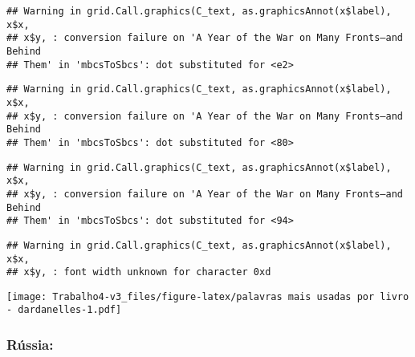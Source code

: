 \documentclass[]{article}
\newenvironment{Shaded}{\begin{snugshade}}{\end{snugshade}}
\newcommand{\KeywordTok}[1]{\textcolor[rgb]{0.13,0.29,0.53}{\textbf{#1}}}
\newcommand{\NormalTok}[1]{#1}
\newcommand{\OperatorTok}[1]{\textcolor[rgb]{0.81,0.36,0.00}{\textbf{#1}}}
\newcommand{\StringTok}[1]{\textcolor[rgb]{0.31,0.60,0.02}{#1}}
\begin{document}
\begin{verbatim}
## Warning in grid.Call.graphics(C_text, as.graphicsAnnot(x$label), x$x,
## x$y, : conversion failure on 'A Year of the War on Many Fronts—and Behind
## Them' in 'mbcsToSbcs': dot substituted for <e2>
\end{verbatim}

\begin{verbatim}
## Warning in grid.Call.graphics(C_text, as.graphicsAnnot(x$label), x$x,
## x$y, : conversion failure on 'A Year of the War on Many Fronts—and Behind
## Them' in 'mbcsToSbcs': dot substituted for <80>
\end{verbatim}

\begin{verbatim}
## Warning in grid.Call.graphics(C_text, as.graphicsAnnot(x$label), x$x,
## x$y, : conversion failure on 'A Year of the War on Many Fronts—and Behind
## Them' in 'mbcsToSbcs': dot substituted for <94>
\end{verbatim}

\begin{verbatim}
## Warning in grid.Call.graphics(C_text, as.graphicsAnnot(x$label), x$x,
## x$y, : font width unknown for character 0xd
\end{verbatim}

\texttt{[image: Trabalho4-v3\_files/figure-latex/palavras mais usadas por livro - dardanelles-1.pdf]}

\hypertarget{russia-2}{%
\subsubsection{Rússia:}\label{russia-2}}

\begin{Shaded}
\end{Shaded}
\end{document}
